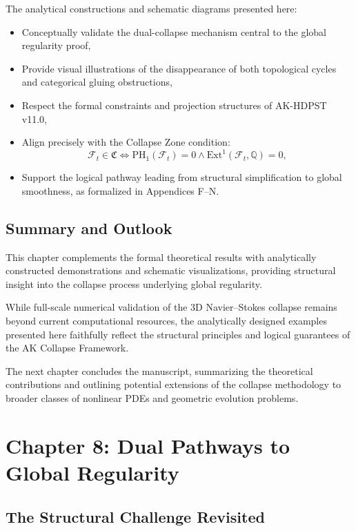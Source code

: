 \documentclass[11pt]{article}
\begin{document}
The analytical constructions and schematic diagrams presented here:

\begin{itemize}
  \item Conceptually validate the dual-collapse mechanism central to the global regularity proof,
  \item Provide visual illustrations of the disappearance of both topological cycles and categorical gluing obstructions,
  \item Respect the formal constraints and projection structures of AK-HDPST v11.0,
  \item Align precisely with the Collapse Zone condition:
  \[
  \mathcal{F}_t \in \mathfrak{C} \iff \mathrm{PH}_1(\mathcal{F}_t) = 0 \land \mathrm{Ext}^1(\mathcal{F}_t, \mathbb{Q}) = 0,
  \]
  \item Support the logical pathway leading from structural simplification to global smoothness, as formalized in Appendices F–N.
\end{itemize}

\subsection{Summary and Outlook}

This chapter complements the formal theoretical results with analytically constructed demonstrations and schematic visualizations, providing structural insight into the collapse process underlying global regularity.

While full-scale numerical validation of the 3D Navier–Stokes collapse remains beyond current computational resources, the analytically designed examples presented here faithfully reflect the structural principles and logical guarantees of the AK Collapse Framework.

The next chapter concludes the manuscript, summarizing the theoretical contributions and outlining potential extensions of the collapse methodology to broader classes of nonlinear PDEs and geometric evolution problems.



\section{Chapter 8: Dual Pathways to Global Regularity}

\subsection{The Structural Challenge Revisited}
\end{document}
